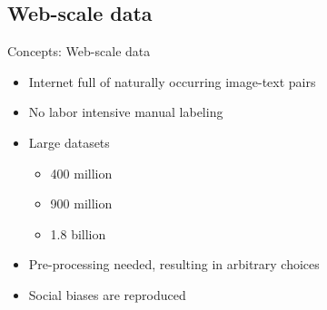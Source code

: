 \documentclass[xcolor=dvipsnames]{beamer}
\begin{document}
\subsection{Web-scale data}
\begin{frame}{Concepts: Web-scale data}
  \begin{itemize}
    \item Internet full of naturally occurring image-text pairs
    \item No labor intensive manual labeling
    \item Large datasets
      \begin{itemize}
        \item 400 million \parencite[CLIP;][]{radford2021learning}
        \item 900 million \parencite[Florence;][]{yuan2021florence}
        \item 1.8 billion \parencite[ALIGN;][]{jia2021scaling}
      \end{itemize}
    \item Pre-processing needed, resulting in arbitrary choices
    \item Social biases are reproduced
  \end{itemize}
\end{frame}
\end{document}
